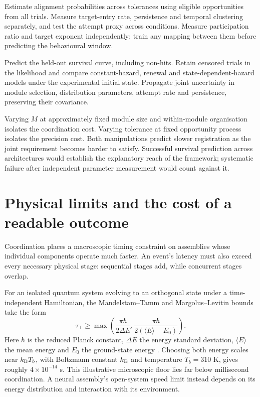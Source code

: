 \documentclass[11pt]{article}
\begin{document}
Estimate alignment probabilities across tolerances using eligible
opportunities from all trials. Measure target-entry rate, persistence and
temporal clustering separately, and test the attempt proxy across
conditions. Measure participation ratio and target exponent independently;
train any mapping between them before predicting the behavioural window.

Predict the held-out survival curve, including non-hits. Retain censored
trials in the likelihood and compare constant-hazard, renewal and
state-dependent-hazard models under the experimental initial state.
Propagate joint uncertainty in module selection, distribution parameters,
attempt rate and persistence, preserving their covariance.

Varying $M$ at approximately fixed module size and within-module
organisation isolates the coordination cost. Varying tolerance at fixed
opportunity process isolates the precision cost. Both manipulations predict
slower registration as the joint requirement becomes harder to satisfy.
Successful survival prediction across architectures would establish the
explanatory reach of the framework; systematic failure after independent
parameter measurement would count against it.

\section{Physical limits and the cost of a readable outcome}

Coordination places a macroscopic timing constraint on assemblies whose
individual components operate much faster. An event's latency must also
exceed every necessary physical stage: sequential stages add, while
concurrent stages overlap.

For an isolated quantum system evolving to an orthogonal state
under a time-independent Hamiltonian, the Mandelstam--Tamm and
Margolus--Levitin bounds take the form
\begin{equation}
 \tau_\perp\geq
 \max\left(\frac{\pi\hbar}{2\Delta E},
           \frac{\pi\hbar}{2(\langle E\rangle-E_0)}\right).
 \label{eq:qsl}
\end{equation}
Here $\hbar$ is the reduced Planck constant, $\Delta E$ the energy
standard deviation, $\langle E\rangle$ the mean energy and $E_0$
the ground-state energy \cite{mandelstam1945,margolus1998}.
Choosing both energy scales near $k_{\rm B}T_b$, with Boltzmann
constant $k_{\rm B}$ and temperature $T_b=310$ K, gives roughly
$4\times10^{-14}$ s. This illustrative microscopic floor lies far below
millisecond coordination. A neural assembly's open-system speed limit
instead depends on its energy distribution and interaction with its
environment.
\end{document}
